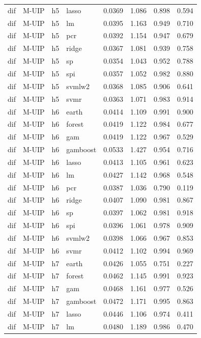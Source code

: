 \begin{ThreePartTable}
\begin{longtable}[t]{llclcccc}
dif & M-UIP & h5 & lasso & 0.0369 & 1.086 & 0.898 & 0.594\\
dif & M-UIP & h5 & lm & 0.0395 & 1.163 & 0.949 & 0.710\\
dif & M-UIP & h5 & pcr & 0.0392 & 1.154 & 0.947 & 0.679\\
dif & M-UIP & h5 & ridge & 0.0367 & 1.081 & 0.939 & 0.758\\
dif & M-UIP & h5 & sp & 0.0354 & 1.043 & 0.952 & 0.788\\
dif & M-UIP & h5 & spi & 0.0357 & 1.052 & 0.982 & 0.880\\
dif & M-UIP & h5 & svmlw2 & 0.0368 & 1.085 & 0.906 & 0.641\\
dif & M-UIP & h5 & svmr & 0.0363 & 1.071 & 0.983 & 0.914\\
\addlinespace
dif & M-UIP & h6 & earth & 0.0414 & 1.109 & 0.991 & 0.900\\
dif & M-UIP & h6 & forest & 0.0419 & 1.122 & 0.984 & 0.677\\
dif & M-UIP & h6 & gam & 0.0419 & 1.122 & 0.967 & 0.529\\
dif & M-UIP & h6 & gamboost & 0.0533 & 1.427 & 0.954 & 0.716\\
dif & M-UIP & h6 & lasso & 0.0413 & 1.105 & 0.961 & 0.623\\
dif & M-UIP & h6 & lm & 0.0427 & 1.142 & 0.968 & 0.548\\
dif & M-UIP & h6 & pcr & 0.0387 & 1.036 & 0.790 & 0.119\\
dif & M-UIP & h6 & ridge & 0.0407 & 1.090 & 0.981 & 0.867\\
dif & M-UIP & h6 & sp & 0.0397 & 1.062 & 0.981 & 0.918\\
dif & M-UIP & h6 & spi & 0.0396 & 1.061 & 0.978 & 0.909\\
dif & M-UIP & h6 & svmlw2 & 0.0398 & 1.066 & 0.967 & 0.853\\
dif & M-UIP & h6 & svmr & 0.0412 & 1.102 & 0.994 & 0.969\\
\addlinespace
dif & M-UIP & h7 & earth & 0.0426 & 1.055 & 0.751 & 0.227\\
dif & M-UIP & h7 & forest & 0.0462 & 1.145 & 0.991 & 0.923\\
dif & M-UIP & h7 & gam & 0.0468 & 1.161 & 0.977 & 0.526\\
dif & M-UIP & h7 & gamboost & 0.0472 & 1.171 & 0.995 & 0.863\\
dif & M-UIP & h7 & lasso & 0.0446 & 1.106 & 0.974 & 0.411\\
dif & M-UIP & h7 & lm & 0.0480 & 1.189 & 0.986 & 0.470\\

\end{longtable}
\end{ThreePartTable}
